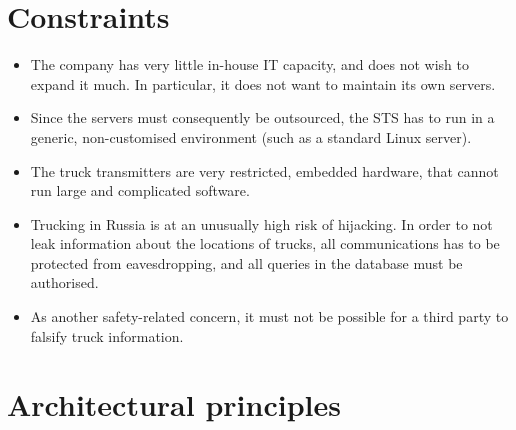 \documentclass[a4paper,11pt]{report}
\begin{document}
\section{Constraints}
\label{sec:constraints}

\begin{itemize}
\item The company has very little in-house IT capacity, and does not
  wish to expand it much.  In particular, it does not want to maintain
  its own servers.
\item Since the servers must consequently be outsourced, the STS has
  to run in a generic, non-customised environment (such as a standard
  Linux server).
\item The truck transmitters are very restricted, embedded hardware,
  that cannot run large and complicated software.
\item Trucking in Russia is at an unusually high risk of hijacking.
  In order to not leak information about the locations of trucks, all
  communications has to be protected from eavesdropping, and all
  queries in the database must be authorised.
\item As another safety-related concern, it must not be possible for a
  third party to falsify truck information.
\end{itemize}

\section{Architectural principles}
\label{sec:arch-princ}
\end{document}
